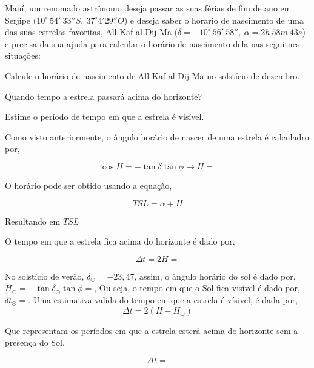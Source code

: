 \documentclass[11pt]{article}
\begin{document}
    \begin{pproblem}
        Mauí, um renomado astrônomo deseja passar as suas férias de fim de ano em Serjipe \((10^\circ \ 54'\ 33'' S, \ 37^\circ 4'29'' O\)) e deseja saber o horario de nascimento de uma das suas estrelas favoritas, All Kaf al Dij Ma  \((\delta = +10^\circ \ 56'\ 58'', \ \alpha = 2h \ 58m \ 43s\)) e precisa da sua ajuda para calcular o horário de nascimento dela nas seguitnes situações:
        \begin{alternativas}
            \item Calcule o horário de nascimento de All Kaf al Dij Ma  no solstício de dezembro.
            \item Quando tempo a estrela passará acima do horizonte?
            \item Estime o período de tempo em que a estrela é visível.
        \end{alternativas}

    \begin{pssolution*}{}{}
        \begin{alternativas}
            \item Como visto anteriormente, o ângulo horário de nascer de uma estrela é calculadro por, 

        \[\cos H = - \tan \delta \tan \phi \rightarrow H = \]

        O horário pode ser obtido usando a equação, 

        \[TSL = \alpha + H\]

        Resultando em \(\boxed{TSL = }\)

        \item O tempo em que a estrela fica acima do horizonte é dado por, 
        
        \[\Delta t = 2 H = \]

        \item No solstício de verão, \(\delta_\odot = -23,47\), assim, o ângulo horário do sol é dado por, \(H_\odot = -\tan\delta_\odot \tan\phi = \), Ou seja, o tempo em que o Sol fica visível é dado por, \(\delta t_\odot = \). Uma estimativa valida do tempo em que a estrela é vísivel, é dada por, 
        \[\Delta t = 2 (H - H_\odot)\]

        Que representam os períodos em que a estrela esterá acima do horizonte sem a presença do Sol, 
       
        \[\boxed{\Delta t = }\]
    \end{alternativas}
        
        
    \end{pssolution*}
    \end{pproblem}
\end{document}
